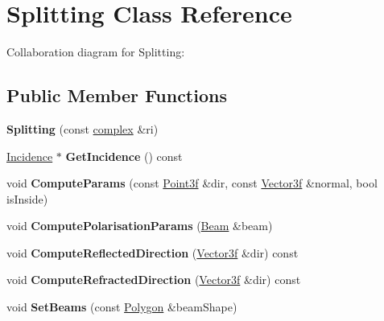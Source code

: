 \hypertarget{class_splitting}{}\section{Splitting Class Reference}
\label{class_splitting}


Collaboration diagram for Splitting\+:
\subsection*{Public Member Functions}
\begin{DoxyCompactItemize}
\item 
\mbox{\label{class_splitting_a982460510ba1af22a9a7929b86e7cc76}} 
{\bfseries Splitting} (const \mbox{\hyperlink{classcomplex}{complex}} \&ri)
\item 
\mbox{\label{class_splitting_a2f4c3a2f4986721a06661c8eb863836f}} 
\mbox{\hyperlink{class_incidence}{Incidence}} $\ast$ {\bfseries Get\+Incidence} () const
\item 
\mbox{\label{class_splitting_ad58e9648f451bcf66769a8ac8ffd4838}} 
void {\bfseries Compute\+Params} (const \mbox{\hyperlink{struct_point3f}{Point3f}} \&dir, const \mbox{\hyperlink{struct_point3f}{Vector3f}} \&normal, bool is\+Inside)
\item 
\mbox{\label{class_splitting_a28c135768ff76d288ddab6f3178573bf}} 
void {\bfseries Compute\+Polarisation\+Params} (\mbox{\hyperlink{class_beam}{Beam}} \&beam)
\item 
\mbox{\label{class_splitting_a3842400b405dc510ec0828749c87f19a}} 
void {\bfseries Compute\+Reflected\+Direction} (\mbox{\hyperlink{struct_point3f}{Vector3f}} \&dir) const
\item 
\mbox{\label{class_splitting_a3aac5abb798e891b1481fd51b53b9764}} 
void {\bfseries Compute\+Refracted\+Direction} (\mbox{\hyperlink{struct_point3f}{Vector3f}} \&dir) const
\item 
\mbox{\label{class_splitting_a7112b68ba0d5c715628916c780e93f95}} 
void {\bfseries Set\+Beams} (const \mbox{\hyperlink{class_polygon}{Polygon}} \&beam\+Shape)
\item 

\end{DoxyCompactItemize}
